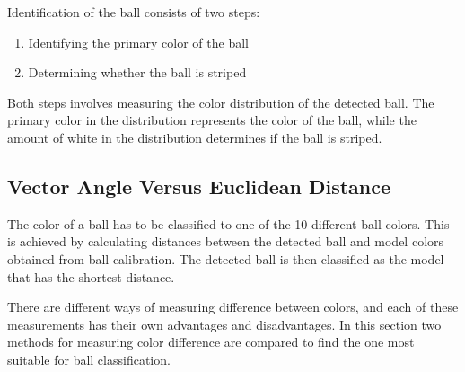 Identification of the ball consists of two steps:
\begin{enumerate}
  \item Identifying the primary color of the ball
  \item Determining whether the ball is striped
\end{enumerate}
Both steps involves measuring the color distribution of the detected ball. The primary color in the distribution represents the color of the ball, while the amount of white in the distribution determines if the ball is striped.

\subsection{Vector Angle Versus Euclidean Distance}
The color of a ball has to be classified to one of the 10 different ball colors. This is achieved by calculating distances between the detected ball and model colors obtained from ball calibration. The detected ball is then classified as the model that has the shortest distance.

There are different ways of measuring difference between colors, and each of these measurements has their own advantages and disadvantages. In this section two methods for measuring color difference are compared to find the one most suitable for ball classification.

